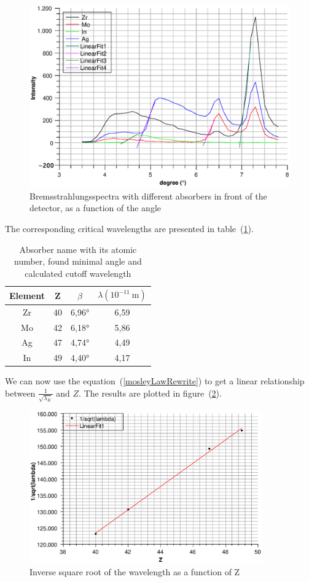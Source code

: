 \documentclass{scrartcl}
\begin{document}
\begin{figure}[!ht]
    \centering
    \includegraphics[width=12cm]{Mosley.eps}
    \caption{Bremsstrahlungsspectra with different absorbers in front of the detector, as a function of the angle}
    \label{fig:spectraMosley}
\end{figure}
\FloatBarrier

\noindent The corresponding critical wavelengths are presented in table~(\ref{tab:mosleyCritWavelength}).

\begin{table}[h]
    \centering
    \begin{tabular}{c|c|c|c}
    Element & Z & $\beta$  &  $\lambda (10^{-11} \ \text{m})$  \\ \hline
    Zr & 40 & 6,96° & 6,59   \\
    Mo & 42 & 6,18° & 5,86  \\
    Ag & 47 & 4,74° & 4,49  \\
    In & 49 & 4,40° & 4,17  
    \end{tabular}
    \caption{Absorber name with its atomic number, found minimal angle and calculated cutoff wavelength}
    \label{tab:mosleyCritWavelength}
\end{table}
\FloatBarrier

\noindent We can now use the equation~(\ref{mosleyLawRewrite}) to get a linear relationship between $\frac{1}{\sqrt{\lambda_K}}$ and $Z$. The results are plotted in figure~(\ref{fig:rydbergPlot}).

\begin{figure}[!ht]
    \centering
    \includegraphics[width=10cm]{mosley_2.eps}
    \caption{Inverse square root of the wavelength as a function of Z}
    \label{fig:rydbergPlot}
\end{figure}
\FloatBarrier
\end{document}
